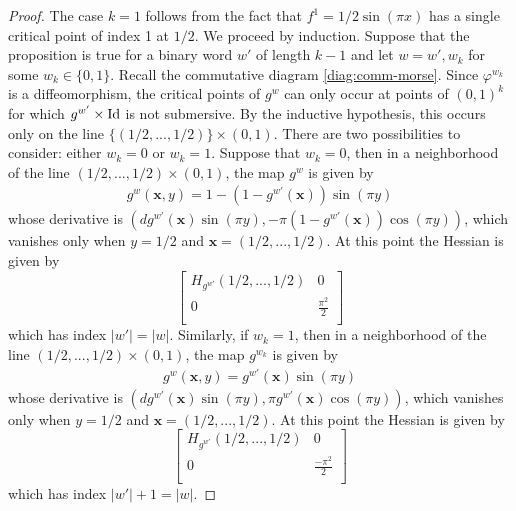 \documentclass[10pt, reqno, twoside
, final
]{amsart}
\numberwithin{equation}{subsection}%
\theoremstyle{definition}
\theoremstyle{definition}
\theoremstyle{definition}
\theoremstyle{definition}
\theoremstyle{definition}
\theoremstyle{definition}
\theoremstyle{definition}
\theoremstyle{definition}
\theoremstyle{definition}
\theoremstyle{plain}
\theoremstyle{definition}
\theoremstyle{plain}
\theoremstyle{definition}
\theoremstyle{plain}
\theoremstyle{definition}
\theoremstyle{definition}
\theoremstyle{plain}
\theoremstyle{plain}
\theoremstyle{definition}
\theoremstyle{plain}
\theoremstyle{plain}
\theoremstyle{plain}
\begin{document}
\begin{proof}
The case $k=1$ follows from the fact that $f^1 = 1/2\sin(\pi x)$ has a single critical point of index 1 at $1/2$. We proceed by induction. Suppose that the proposition is true for a binary word $w'$ of length $k-1$ and let $w = w',w_k$ for some $w_k \in \{0,1\}$. 
Recall the commutative diagram \eqref{diag:comm-morse}.
Since $\varphi^{w_k}$ is a diffeomorphism, the critical points of $g^w$ can only occur at points of $(0,1)^k$ for which $g^{w'}\times \text{Id}$ is not submersive. By the inductive hypothesis, this occurs only on the line $\{(1/2,...,1/2)\}\times (0,1)$. There are two possibilities to consider: either $w_k =0$ or $w_k=1$. Suppose that $w_k=0$, then in a neighborhood of the line $(1/2,...,1/2)\times (0,1)$, the map $g^{w}$ is given by
\begin{align*}
    g^w(\mathbf{x},y) =  1-(1-g^{w'}(\mathbf{x}))\sin(\pi y)
\end{align*}
whose derivative is $(dg^{w'}(\mathbf{x})\sin(\pi y), -\pi(1-g^{w'}(\mathbf{x}))\cos(\pi y))$, which vanishes only when $y=1/2$ and $\mathbf{x}=(1/2,...,1/2)$. At this point the Hessian is given by
\begin{equation*}
    \begin{bmatrix}
         H_{g^{w'}}(1/2,...,1/2) & 0 \\
        0 & \frac{\pi^2}{2} \\
    \end{bmatrix}
\end{equation*}
which has index $|w'| = |w|$. Similarly, if $w_k=1$, then in a neighborhood of the line $(1/2,...,1/2)\times (0,1)$, the map $g^{w_k}$ is given by
\begin{align*}
    g^w(\mathbf{x},y) =  g^{w'}(\mathbf{x})\sin(\pi y)
\end{align*}
whose derivative is $(dg^{w'}(\mathbf{x})\sin(\pi y), \pi g^{w'}(\mathbf{x})\cos(\pi y))$, which vanishes only when $y=1/2$ and $\mathbf{x}=(1/2,...,1/2)$. At this point the Hessian is given by
\begin{equation*}
    \begin{bmatrix}
         H_{g^{w'}}(1/2,...,1/2) & 0 \\
        0 & \frac{-\pi^2}{2} \\
    \end{bmatrix}
\end{equation*}
which has index $|w'| + 1 = |w|$.
\end{proof}
\end{document}
